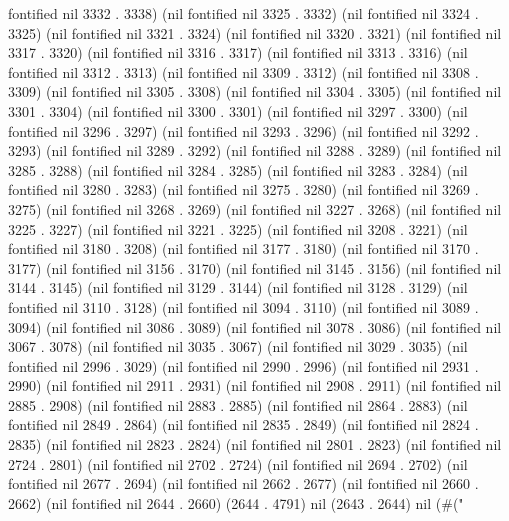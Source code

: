 fontified nil 3332 . 3338) (nil fontified nil 3325 . 3332) (nil fontified nil 3324 . 3325) (nil fontified nil 3321 . 3324) (nil fontified nil 3320 . 3321) (nil fontified nil 3317 . 3320) (nil fontified nil 3316 . 3317) (nil fontified nil 3313 . 3316) (nil fontified nil 3312 . 3313) (nil fontified nil 3309 . 3312) (nil fontified nil 3308 . 3309) (nil fontified nil 3305 . 3308) (nil fontified nil 3304 . 3305) (nil fontified nil 3301 . 3304) (nil fontified nil 3300 . 3301) (nil fontified nil 3297 . 3300) (nil fontified nil 3296 . 3297) (nil fontified nil 3293 . 3296) (nil fontified nil 3292 . 3293) (nil fontified nil 3289 . 3292) (nil fontified nil 3288 . 3289) (nil fontified nil 3285 . 3288) (nil fontified nil 3284 . 3285) (nil fontified nil 3283 . 3284) (nil fontified nil 3280 . 3283) (nil fontified nil 3275 . 3280) (nil fontified nil 3269 . 3275) (nil fontified nil 3268 . 3269) (nil fontified nil 3227 . 3268) (nil fontified nil 3225 . 3227) (nil fontified nil 3221 . 3225) (nil fontified nil 3208 . 3221) (nil fontified nil 3180 . 3208) (nil fontified nil 3177 . 3180) (nil fontified nil 3170 . 3177) (nil fontified nil 3156 . 3170) (nil fontified nil 3145 . 3156) (nil fontified nil 3144 . 3145) (nil fontified nil 3129 . 3144) (nil fontified nil 3128 . 3129) (nil fontified nil 3110 . 3128) (nil fontified nil 3094 . 3110) (nil fontified nil 3089 . 3094) (nil fontified nil 3086 . 3089) (nil fontified nil 3078 . 3086) (nil fontified nil 3067 . 3078) (nil fontified nil 3035 . 3067) (nil fontified nil 3029 . 3035) (nil fontified nil 2996 . 3029) (nil fontified nil 2990 . 2996) (nil fontified nil 2931 . 2990) (nil fontified nil 2911 . 2931) (nil fontified nil 2908 . 2911) (nil fontified nil 2885 . 2908) (nil fontified nil 2883 . 2885) (nil fontified nil 2864 . 2883) (nil fontified nil 2849 . 2864) (nil fontified nil 2835 . 2849) (nil fontified nil 2824 . 2835) (nil fontified nil 2823 . 2824) (nil fontified nil 2801 . 2823) (nil fontified nil 2724 . 2801) (nil fontified nil 2702 . 2724) (nil fontified nil 2694 . 2702) (nil fontified nil 2677 . 2694) (nil fontified nil 2662 . 2677) (nil fontified nil 2660 . 2662) (nil fontified nil 2644 . 2660) (2644 . 4791) nil (2643 . 2644) nil (#("
